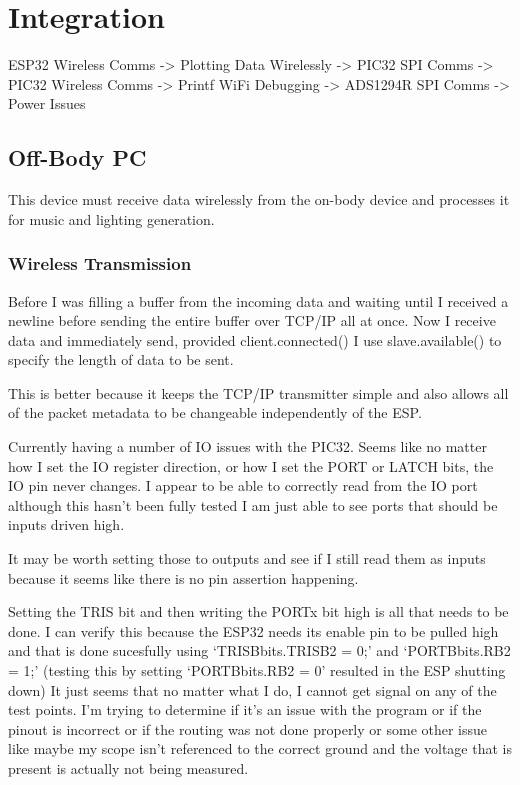 \chapter{Integration}
ESP32 Wireless Comms -> Plotting Data Wirelessly -> PIC32 SPI Comms -> PIC32 Wireless Comms -> Printf WiFi Debugging -> ADS1294R SPI Comms -> Power Issues

\section{Off-Body PC}
This device must receive data wirelessly from the on-body device and processes it for music and lighting generation.




\subsection{Wireless Transmission}

Before I was filling a buffer from the incoming data and waiting until I received
a newline before sending the entire buffer over TCP/IP all at once.
Now I receive data and immediately send, provided client.connected()
I use slave.available() to specify the length of data to be sent.

This is better because it keeps the TCP/IP transmitter simple and also allows all
of the packet metadata to be changeable independently of the ESP.

Currently having a number of IO issues with the PIC32.
Seems like no matter how I set the IO register direction, or how I set
the PORT or LATCH bits, the IO pin never changes.
I appear to be able to correctly read from the IO port although this
hasn't been fully tested I am just able to see ports that should be
inputs driven high.

It may be worth setting those to outputs and see if I still read them
as inputs because it seems like there is no pin assertion happening.

Setting the TRIS bit and then writing the PORTx bit high is all that
needs to be done.
I can verify this because the ESP32 needs its enable pin to be pulled
high and that is done sucesfully using `TRISBbits.TRISB2 = 0;' and
`PORTBbits.RB2 = 1;'
(testing this by setting `PORTBbits.RB2 = 0' resulted in the ESP
shutting down)
It just seems that no matter what I do, I cannot get signal on any of
the test points. I'm trying to determine if it's an issue with the
program or if the pinout is incorrect or if the routing was not done
properly or some other issue like maybe my scope isn't referenced to
the correct ground and the voltage that is present is actually not
being measured.

